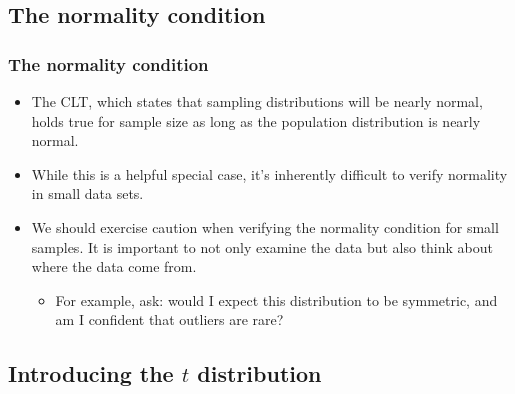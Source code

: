 
\subsection{The normality condition}


\begin{frame}
\frametitle{The normality condition}

\begin{itemize}

\item The CLT, which states that sampling distributions will be nearly normal, holds true for  sample size as long as the population distribution is nearly normal.

\pause

\item While this is a helpful special case, it's inherently difficult to verify normality in small data sets.

\pause

\item We should exercise caution when verifying the normality condition for small samples. It is important to not only examine the data but also think about where the data come from. 
\begin{itemize}
\item For example, ask: would I expect this distribution to be symmetric, and am I confident that outliers are rare?
\end{itemize}

\end{itemize}

\end{frame}


\subsection{Introducing the $t$ distribution}


